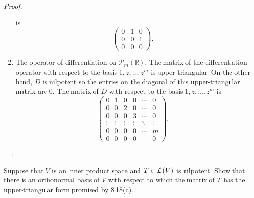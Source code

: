 \begin{proof}
\begin{enumerate}[label={(\alph*)}]
              is
              \[
                  \begin{pmatrix}
                      0 & 1 & 0 \\
                      0 & 0 & 1 \\
                      0 & 0 & 0
                  \end{pmatrix}.
              \]
        \item The operator of differentiation on $\mathscr{P}_{m}(\mathbb{R})$. The matrix of the differentiation operator with respect to the basis $1, z, \ldots, z^{m}$ is upper triangular. On the other hand, $D$ is nilpotent so the entries on the diagonal of this upper-triangular matrix are $0$. The matrix of $D$ with respect to the basis $1, z, \ldots, z^{m}$ is
              \[
                  \begin{pmatrix}
                      0      & 1      & 0      & 0      & \cdots & 0      \\
                      0      & 0      & 2      & 0      & \cdots & 0      \\
                      0      & 0      & 0      & 3      & \cdots & 0      \\
                      \vdots & \vdots & \vdots & \vdots & \ddots & \vdots \\
                      0      & 0      & 0      & 0      & \cdots & m      \\
                      0      & 0      & 0      & 0      & \cdots & 0
                  \end{pmatrix}.
              \]
    \end{enumerate}
\end{proof}
\newpage

\begin{exercise}\label{chapter8:sectionA:exercise25}
    Suppose that $V$ is an inner product space and $T \in \mathcal{L}\left({V}\right)$ is nilpotent. Show that there is an orthonormal basis of $V$ with respect to which the matrix of $T$ has the upper-triangular form promised by 8.18(c).
\end{exercise}

